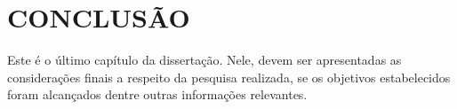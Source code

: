 
\chapter{CONCLUSÃO}

Este é o último capítulo da dissertação. Nele, devem ser apresentadas as considerações finais a respeito da pesquisa realizada,  se os objetivos estabelecidos foram alcançados dentre outras informações relevantes.